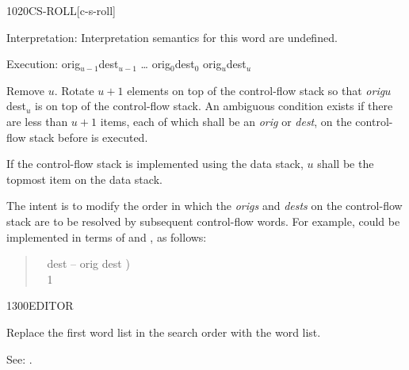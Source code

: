 \begin{newword*}{1020}{CS-ROLL}[c-s-roll]
\item[Interpretation:]
	Interpretation semantics for this word are undefined.

\item[Execution:]
			 {orig$_{u-1}${\textbar}dest$_{u-1}$ {\ldots} orig$_0${\textbar}dest$_0$ orig$_u${\textbar}dest$_u$}

	Remove $u$. Rotate $u+1$ elements on top of the control-flow
	stack so that \emph{orig}$u${\textbar}dest$_u$ is on top of the
	control-flow stack. An ambiguous condition exists if there are
	less than $u+1$ items, each of which shall be an \emph{orig} or
	\emph{dest}, on the control-flow stack before  is
	executed.

	If the control-flow stack is implemented using the data stack,
	$u$ shall be the topmost item on the data stack.

	\begin{rationale} %
		The intent is to modify the order in which the \emph{origs}
		and \emph{dests} on the control-flow stack are to be resolved
		by subsequent control-flow words. For example, 
		could be implemented in terms of  and
		, as follows:

		\begin{quote}\ttfamily
			\word{:}  ~  dest -- orig dest ) \\
			\tab {}  ~ 1  \\
			\word{;} 
		\end{quote}
	\end{rationale}
\end{newword*}


\begin{newword}{1300}{EDITOR}
	\stack{}{}

	Replace the first word list in the search order with the
	 word list.

\item[See:]
	.
\end{newword}


